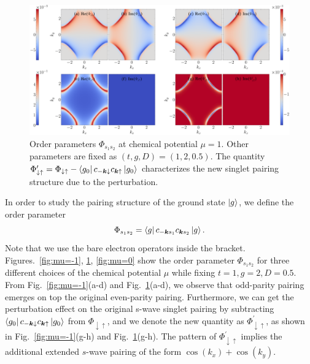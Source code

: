 \documentclass[11pt]{article}
\begin{document}
\begin{figure}[tb]
  \centering
  \includegraphics[width=\linewidth]{../plot/order_1.0_2.0_0.5.pdf}
  \caption{Order parameters $\Phi_{s_1 s_2}$ at chemical potential $\mu = 1$. Other parameters are
  fixed as $(t, g, D) = (1, 2, 0.5)$. The quantity $\Phi^\prime_{\downarrow \uparrow} =
  \Phi_{\downarrow \uparrow} - \left \langle g_0 \right \rvert c_{-\bm k \downarrow} c_{\bm k \uparrow} \left \rvert g_0 \right \rangle$
  characterizes the new singlet pairing structure due to the perturbation.}
  \label{fig:mu=1}
\end{figure}

In order to study the pairing structure of the ground state $\left \rvert g \right \rangle$, we define the order parameter
\begin{equation}\label{eq:order_parameter}
    \Phi_{s_1 s_2} = \left \langle g \right \rvert c_{-\bm k s_1} c_{\bm k s_2} \left \rvert g \right \rangle.
\end{equation}
Note that we use the bare electron operators inside the bracket.
Figures.~\ref{fig:mu=-1}, \ref{fig:mu=1}, \ref{fig:mu=0} show the order parameter $\Phi_{s_1 s_2}$ for three
different choices of the chemical potential $\mu$ while fixing $t=1, g = 2, D=0.5$.
From Fig.~\ref{fig:mu=-1}(a-d) and Fig.~\ref{fig:mu=1}(a-d), we observe that odd-parity pairing emerges on top the
original even-parity pairing. Furthermore, we can get the perturbation effect on the original
s-wave singlet pairing by subtracting $\left \langle g_0 \right \rvert c_{-\bm k \downarrow} c_{\bm k \uparrow} \left \rvert g_0 \right \rangle$
from $\Phi_{\downarrow \uparrow}$, and we denote the new quantity as $\Phi^\prime_{\downarrow \uparrow}$,
as shown in Fig.~\ref{fig:mu=-1}(g-h) and Fig.~\ref{fig:mu=1}(g-h). The pattern of $\Phi^\prime_{\downarrow \uparrow}$
implies the additional extended $s$-wave pairing of the form $\cos(k_x) + \cos(k_y)$.
\end{document}
